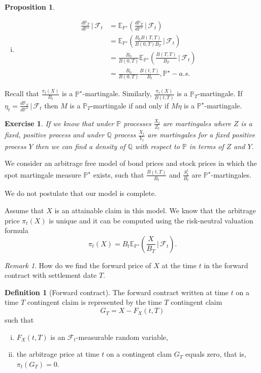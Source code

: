 \documentclass[10pt, oneside, reqno]{amsbook}
\theoremstyle{plain}%
\newtheorem{prop}[thm]{Proposition}
\newtheorem{exer}[thm]{Exercise}
\theoremstyle{definition}
\newtheorem{defn}[thm]{Definition}
\theoremstyle{remark}
\newtheorem*{rem}{Remark}
\newcommand{\given}{ \, | \,}
\newcommand{\sigf}{\mathcal{F}}
\newcommand{\Q}{\mathbb{Q}}
\newcommand{\E}{\mathbb{E}}
\renewcommand{\P}{\mathbb{P}}
\numberwithin{equation}{chapter}
\begin{document}
\begin{prop}{\ }
    \begin{enumerate}[(i)]
        \item \begin{align*}
            \frac{d\P_T}{d\P^\star} \given \sigf_t &= \E_{\P^\star} \left( \frac{d\P_T}{d\P^\star} \given \sigf_t \right) \\
                &= \E_{\P^\star} \left( \frac{B_0 B(T, T)}{B(0, T) B_T} \given \sigf_t \right) \\
                &= \frac{B_0}{B(0, T)} \E_{\P^\star} \left( \frac{B(T, T)}{B_T} \given \sigf_t \right) \\
                &= \frac{B_0}{B(0, T)} \frac{B(t, T)}{B_t}, \P^\star-a.s.
        \end{align*}
    \end{enumerate} 
\end{prop}

Recall that $\frac{\pi_t(X)}{B_t}$ is a $\P^\star$-martingale. Similarly, $\frac{\pi_t(X)}{B(t, T)}$ is a $\P_T$-martingale.  If $\eta_t = \frac{d \P_T}{d\P^\star} \given \sigf_t$ then $M$ is a $\P_T$-martingale if and only if $M \eta$ is a $\P^\star$-martingale.  

\begin{exer}
    If we know that under $\P$ processes $\frac{X_t}{Z_t}$ are martingales where $Z$ is a fixed, positive process and under $\Q$ process $\frac{X_t}{Y_t}$ are martingales for a fixed positive process $Y$ then we can find a density of $\Q$ with respect to $\P$ in terms of $Z$ and $Y$. 
\end{exer}


We consider an arbitrage free model of bond prices and stock prices in which the spot martingale measure $\P^\star$ exists, such that $\frac{B(t, T)}{B_t}$ and $\frac{S^i_t}{B_t}$ are $\P^\star$-martingales.

We do not postulate that our model is complete.

Assume that $X$ is an attainable claim in this model.  We know that the arbitrage price $\pi_t(X)$ is unique and it can be computed using the risk-neutral valuation formula \[
    \pi_t(X) = B_t \E_{\P^\star} \left( \frac{X}{B_T} \given \sigf_t \right).
\]

\begin{rem}
    How do we find the forward price of $X$ at the time $t$ in the forward contract with settlement date $T$.
\end{rem}

\begin{defn}[Forward contract]
    The forward contract written at time $t$ on a time $T$ contingent claim is represented by the time $T$ contingent claim \[
        G_T = X - F_X(t, T)
    \] such that \begin{enumerate}[(i)]
        \item $F_X(t, T)$ is an $\sigf_t$-measurable random variable, 
        \item the arbitrage price at time $t$ on a contingent clam $G_T$ equals zero, that is, $\pi_t(G_T) = 0$.
    \end{enumerate}
\end{defn}
\end{document}
